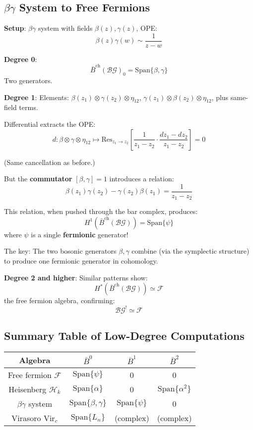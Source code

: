 \subsection{$\beta\gamma$ System to Free Fermions}

\textbf{Setup}: $\beta\gamma$ system with fields $\beta(z), \gamma(z)$, OPE:
$$\beta(z)\gamma(w) \sim \frac{1}{z-w}$$

\textbf{Degree 0}:
$$\bar{B}^{\text{ch}}(\mathcal{BG})_0 = \text{Span}\{\beta, \gamma\}$$
Two generators.

\textbf{Degree 1}:
Elements: $\beta(z_1) \otimes \gamma(z_2) \otimes \eta_{12}$, 
$\gamma(z_1) \otimes \beta(z_2) \otimes \eta_{12}$, plus same-field terms.

Differential extracts the OPE:
$$d: \beta \otimes \gamma \otimes \eta_{12} \mapsto 
   \text{Res}_{z_1 \to z_2}\left[\frac{1}{z_1-z_2} \cdot \frac{dz_1-dz_2}{z_1-z_2}\right] = 0$$

(Same cancellation as before.)

But the \textbf{commutator} $[\beta, \gamma] = 1$ introduces a relation:
$$\beta(z_1)\gamma(z_2) - \gamma(z_2)\beta(z_1) = \frac{1}{z_1-z_2}$$

This relation, when pushed through the bar complex, produces:
$$H^1(\bar{B}^{\text{ch}}(\mathcal{BG})) = \text{Span}\{\psi\}$$
where $\psi$ is a single \textbf{fermionic} generator!

The key: The two bosonic generators $\beta, \gamma$ combine (via the symplectic structure) 
to produce one fermionic generator in cohomology.

\textbf{Degree 2 and higher}: Similar patterns show:
$$H^*(\bar{B}^{\text{ch}}(\mathcal{BG})) \simeq \mathcal{F}$$
the free fermion algebra, confirming:
$$\mathcal{BG}^! \simeq \mathcal{F}$$

\subsection{Summary Table of Low-Degree Computations}

\begin{center}
\begin{tabular}{c|c|c|c}
\textbf{Algebra} & $\bar{B}^0$ & $\bar{B}^1$ & $\bar{B}^2$ \\ \hline
Free fermion $\mathcal{F}$ & $\text{Span}\{\psi\}$ & 0 & 0 \\
Heisenberg $\mathcal{H}_k$ & $\text{Span}\{\alpha\}$ & 0 & $\text{Span}\{\alpha^2\}$ \\
$\beta\gamma$ system & $\text{Span}\{\beta,\gamma\}$ & $\text{Span}\{\psi\}$ & 0 \\
Virasoro $\text{Vir}_c$ & $\text{Span}\{L_n\}$ & (complex) & (complex)
\end{tabular}
\end{center}

